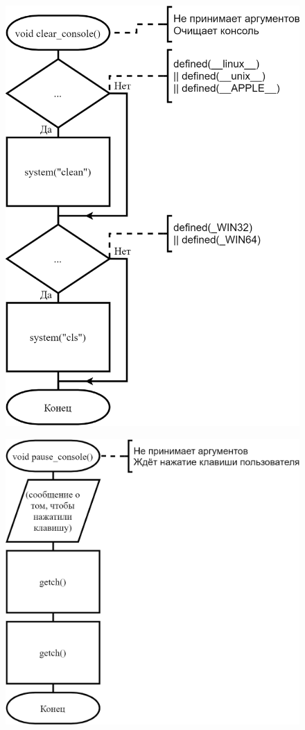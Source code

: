 \begin{figure}[!htp]
    \includegraphics{../../Makefile-project/src/libs/clear_console/clear_console.png}
\end{figure}

\begin{figure}[!htp]
    \includegraphics{../../Makefile-project/src/libs/pause_console/pause_console.png}
\end{figure}

